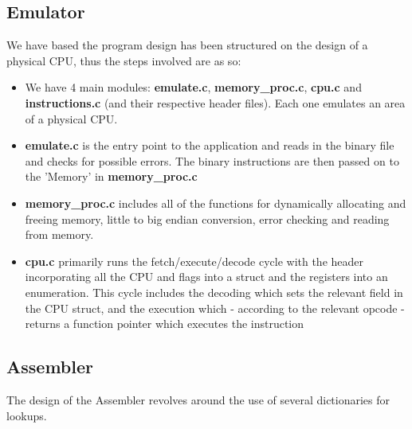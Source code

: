 \documentclass[11pt]{article}
\begin{document}
\subsection{Emulator}
We have based the program design has been structured on the design of a physical CPU, thus the steps involved are as so:
\begin{itemize}

\item
We have 4 main modules: \textbf{emulate.c}, \textbf{memory\_proc.c}, \textbf{cpu.c} and \textbf{instructions.c} (and their respective header files). Each one emulates an area of a physical CPU.

\item
\textbf{emulate.c} is the entry point to the application and reads in the binary file and checks for possible errors. The binary instructions are then passed on to the 'Memory' in \textbf{memory\_proc.c}

\item
\textbf{memory\_proc.c} includes all of the functions for dynamically allocating and freeing memory, little to big endian conversion, error checking and reading from memory.

\item
\textbf{cpu.c} primarily runs the fetch/execute/decode cycle with the header incorporating all the CPU and flags into a struct and the registers into an enumeration. This cycle includes the decoding which sets the relevant field in the CPU struct, and the execution which - according to the relevant opcode - returns a function pointer which executes the instruction


\end{itemize}

\subsection{Assembler}
The design of the Assembler revolves around the use of several dictionaries for lookups.
\end{document}
